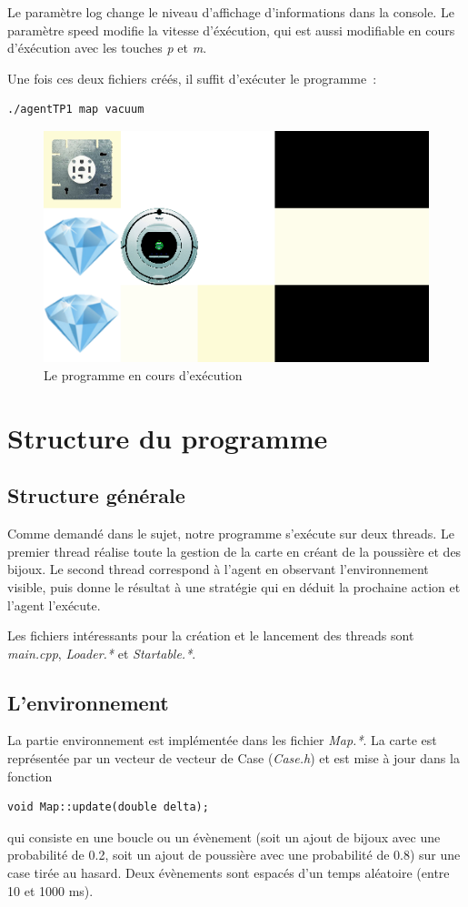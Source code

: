 \documentclass{article}
\begin{document}
Le paramètre log change le niveau d'affichage d'informations dans la console. Le paramètre speed modifie la vitesse d'éxécution, qui est aussi modifiable en cours d'éxécution avec les touches \emph{p} et \emph{m}.

Une fois ces deux fichiers créés, il suffit d'exécuter le programme~:
\begin{verbatim}
./agentTP1 map vacuum
\end{verbatim}

\begin{figure}[h]
	\begin{center}
		\includegraphics[scale=0.4]{execution}
		\caption{Le programme en cours d'exécution}
		\label{fig:Execution}
	\end{center}
\end{figure}

\section{Structure du programme}
\subsection{Structure générale}
Comme demandé dans le sujet, notre programme s'exécute sur deux threads. Le premier thread réalise toute la gestion de la carte en créant de la poussière et des bijoux. Le second thread correspond à l'agent en observant l'environnement visible, puis donne le résultat à une stratégie qui en déduit la prochaine action et l'agent l'exécute.

Les fichiers intéressants pour la création et le lancement des threads sont \emph{main.cpp}, \emph{Loader.*} et \emph{Startable.*}.
\subsection{L'environnement}
La partie environnement est implémentée dans les fichier \emph{Map.*}. La carte est représentée par un vecteur de vecteur de Case (\emph{Case.h}) et est mise à jour dans la fonction \begin{verbatim}
void Map::update(double delta);
\end{verbatim}
qui consiste en une boucle ou un évènement (soit un ajout de bijoux avec une probabilité de 0.2, soit un ajout de poussière avec une probabilité de 0.8) sur une case tirée au hasard. Deux évènements sont espacés d'un temps aléatoire (entre 10 et 1000 ms).
\end{document}
